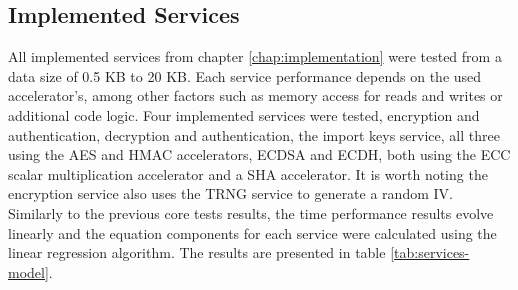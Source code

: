 \subsection{Implemented Services}\label{chap:evaluation:services}

All implemented services from chapter \ref{chap:implementation} were tested from a data size of 0.5 KB to 20 KB. Each service performance depends on the used accelerator's, among other factors such as memory access for reads and writes or additional code logic.
Four implemented services were tested, encryption and authentication, decryption and authentication, the import keys service, all three using the \ac{AES} and \ac{HMAC} accelerators, \ac{ECDSA} and \ac{ECDH}, both using the \ac{ECC} scalar multiplication accelerator and a \ac{SHA} accelerator. It is worth noting the encryption service also uses the \ac{TRNG} service to generate a random \ac{IV}.
Similarly to the previous core tests results, the time performance results evolve linearly and the equation components for each service were calculated using the linear regression algorithm. The results are presented in table \ref{tab:services-model}.



